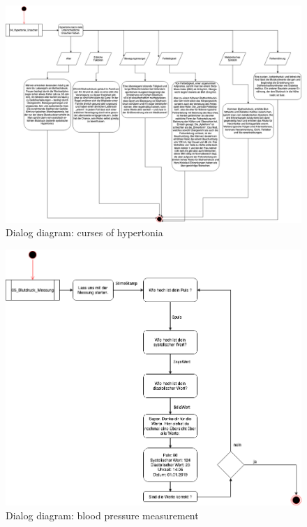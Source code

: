 \begin{figure}[h]
	\centering
	\includegraphics[width=1\textwidth]{images/02_Hypertonie_Ursachen.png}
	\caption{Dialog diagram: curses of hypertonia}
	\label{dialog_diagram_02}
\end{figure}

\begin{figure}[h]
	\centering
	\includegraphics[width=1\textwidth]{images/03_blutdruck_messung.png}
	\caption{Dialog diagram: blood pressure measurement}
	\label{dialog_diagram_03}
\end{figure}

